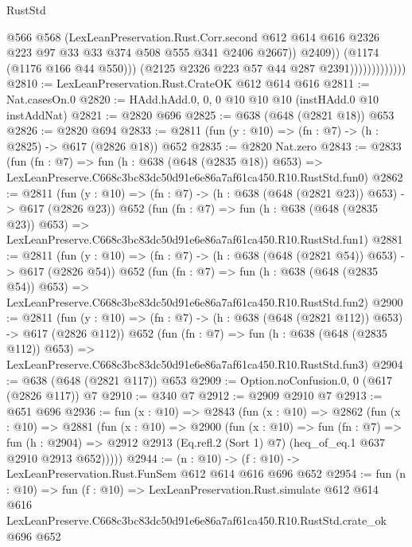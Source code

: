 \begin{lexlean}{RustStd}
\begin{coremodule}
                                    @566
                                    @568
                                    (LexLeanPreservation.Rust.Corr.second
                                      @612
                                      @614
                                      @616
                                      @2326
                                      @223
                                      @97
                                      @33
                                      @33
                                      @374
                                      @508
                                      @555
                                      @341
                                      @2406
                                      @2667))
                                  @2409))
                              (@1174 (@1176 @166 @44 @550)))
                            (@2125 @2326 @223 @57 @44 @287 @2391)))))))))))))
@2810 := LexLeanPreservation.Rust.CrateOK @612 @614 @616
@2811 := Nat.casesOn.{0}
@2820 := HAdd.hAdd.{0, 0, 0} @10 @10 @10 (instHAdd.{0} @10 instAddNat)
@2821 := @2820 @696
@2825 := @638 (@648 (@2821 @18)) @653
@2826 := @2820 @694
@2833 := @2811 (fun (y : @10) => (fn : @7) -> (h : @2825) -> @617 (@2826 @18)) @652
@2835 := @2820 Nat.zero
@2843 := @2833
    (fun (fn : @7) =>
    fun (h : @638 (@648 (@2835 @18)) @653) =>
    LexLeanPreserve.C668c3bc83dc50d91e6e86a7af61ca450.R10.RustStd.fun0)
@2862 := @2811
    (fun (y : @10) => (fn : @7) -> (h : @638 (@648 (@2821 @23)) @653) -> @617 (@2826 @23))
    @652
    (fun (fn : @7) =>
    fun (h : @638 (@648 (@2835 @23)) @653) =>
    LexLeanPreserve.C668c3bc83dc50d91e6e86a7af61ca450.R10.RustStd.fun1)
@2881 := @2811
    (fun (y : @10) => (fn : @7) -> (h : @638 (@648 (@2821 @54)) @653) -> @617 (@2826 @54))
    @652
    (fun (fn : @7) =>
    fun (h : @638 (@648 (@2835 @54)) @653) =>
    LexLeanPreserve.C668c3bc83dc50d91e6e86a7af61ca450.R10.RustStd.fun2)
@2900 := @2811
    (fun (y : @10) => (fn : @7) -> (h : @638 (@648 (@2821 @112)) @653) -> @617 (@2826 @112))
    @652
    (fun (fn : @7) =>
    fun (h : @638 (@648 (@2835 @112)) @653) =>
    LexLeanPreserve.C668c3bc83dc50d91e6e86a7af61ca450.R10.RustStd.fun3)
@2904 := @638 (@648 (@2821 @117)) @653
@2909 := Option.noConfusion.{0, 0} (@617 (@2826 @117)) @7
@2910 := @340 @7
@2912 := @2909 @2910 @7
@2913 := @651 @696
@2936 := fun (x : @10) =>
  @2843
    (fun (x : @10) =>
    @2862
      (fun (x : @10) =>
      @2881
        (fun (x : @10) =>
        @2900
          (fun (x : @10) =>
          fun (fn : @7) =>
          fun (h : @2904) =>
          @2912 @2913 (Eq.refl.{2} (Sort 1) @7) (heq_of_eq.{1} @637 @2910 @2913 @652)))))
@2944 := (n : @10) -> (f : @10) -> LexLeanPreservation.Rust.FunSem @612 @614 @616 @696 @652
@2954 := fun (n : @10) =>
  fun (f : @10) =>
  LexLeanPreservation.Rust.simulate
    @612
    @614
    @616
    LexLeanPreserve.C668c3bc83dc50d91e6e86a7af61ca450.R10.RustStd.crate_ok
    @696
    @652
\end{coremodule}
\end{lexlean}
